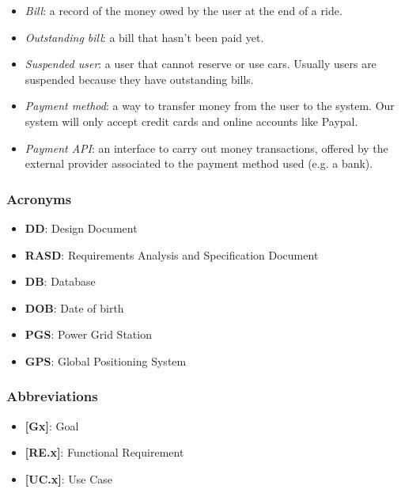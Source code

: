 \documentclass[english]{article}
\begin{document}
\begin{itemize}
\item{\textit{Bill}: a record of the money owed by the user at the end of a ride.}
\item{\textit{Outstanding bill}: a bill that hasn’t been paid yet. }
\item{\textit{Suspended user}: a user that cannot reserve or use cars. Usually users are suspended because they have outstanding bills.}
\item{\textit{Payment method}: a way to transfer money from the user to the system. Our system will only accept credit cards and online accounts like Paypal.}
\item{\textit{Payment API}: an interface to carry out money transactions, offered by the external provider associated to the payment method used (e.g. a bank).}
\end{itemize}

\subsubsection{Acronyms}
\begin{itemize}
\item{\textbf{DD}: Design Document}
\item{\textbf{RASD}: Requirements Analysis and Specification Document}
\item{\textbf{DB}: Database}
\item{\textbf{DOB}: Date of birth}
\item{\textbf{PGS}: Power Grid Station}
\item{\textbf{GPS}: Global Positioning System}
\end{itemize}

\subsubsection{Abbreviations}
\begin{itemize}
\item{\textbf{[Gx]}: Goal}
\item{\textbf{[RE.x]}: Functional Requirement}
\item{\textbf{[UC.x]}: Use Case}
\end{itemize}
\end{document}

